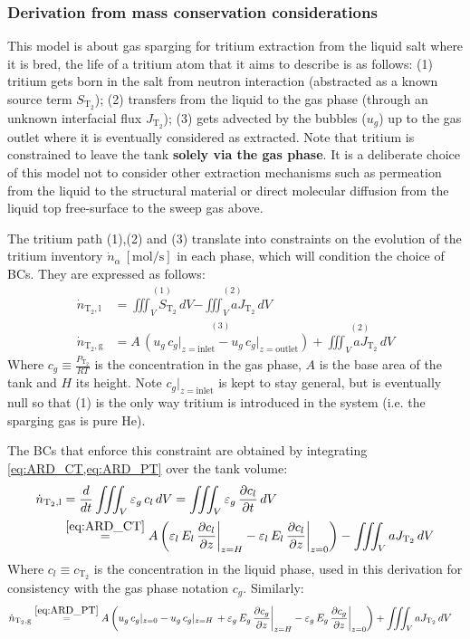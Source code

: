 \documentclass[a4paper,11pt,oneside]{report}
\newcommand{\PT}{\ensuremath{P_\mathrm{T_2}}}
\newcommand{\CT}{\ensuremath{c_\mathrm{T_2}}}
\newcommand{\JT}{\ensuremath{J_\mathrm{T_2}}}
\newcommand{\dotNTl}{\ensuremath{\dot n_\mathrm{T_2,l}}}
\newcommand{\dotNTg}{\ensuremath{\dot n_\mathrm{T_2,g}}}
\begin{document}
\subsubsection{Derivation from mass conservation considerations}

This model is about gas sparging for tritium extraction from the liquid salt where it is bred, the life of a tritium atom that it aims to describe is as follows: (1) tritium gets born in the salt from neutron interaction (abstracted as a known source term $S_\mathrm{T_2}$); (2) transfers from the liquid to the gas phase (through an unknown interfacial flux \JT); (3) gets advected by the bubbles ($u_g$) up to the gas outlet where it is eventually considered as extracted. Note that tritium is constrained to leave the tank \textbf{solely via the gas phase}. It is a deliberate choice of this model not to consider other extraction mechanisms such as permeation from the liquid to the structural material or direct molecular diffusion from the liquid top free-surface to the sweep gas above. 

The tritium path (1),(2) and (3) translate into constraints on the evolution of the tritium inventory $\dot n_\alpha \ \mathrm{[mol/s]}$ in each phase, which will condition the choice of BCs. They are expressed as follows: 
\begin{align}
    \dotNTl &= \stackrel{(1)}{\iiint_V S_\mathrm{T_2} \,dV}\stackrel{(2)}{- \iiint_V a\JT \,dV} \label{eq:n_l_constraint}\\
    \dotNTg &= \stackrel{(3)}{A \,(u_g\,c_g\rvert_{z=\mathrm{inlet}} - u_g\,c_g\rvert_{z=\mathrm{outlet}})} + \stackrel{(2)}{\iiint_V a\JT \,dV} \label{eq:n_g_constraint}
\end{align}
Where $c_g \equiv\frac{\PT}{RT}$ is the concentration in the gas phase, $A$ is the base area of the tank and $H$ its height. Note $c_g\rvert_{z=\mathrm{inlet}}$ is kept to stay general, but is eventually null so that (1) is the only way tritium is introduced in the system (i.e. the sparging gas is pure He).


The BCs that enforce this constraint are obtained by integrating \cref{eq:ARD_CT,eq:ARD_PT} over the tank volume:
\begin{align}
    \dotNTl &= \frac{d}{dt}\iiint_V \varepsilon_g \,c_l \,dV =\iiint_V \varepsilon_g \, \frac{\partial c_l}{\partial t}\,dV  \nonumber\\
    &\stackrel{\eqref{eq:ARD_CT}}{=} A\,\bigg(\varepsilon_l\,E_l\,\frac{\partial c_l}{\partial z}\bigg\rvert_{z=H} -\varepsilon_l\,E_l\,\frac{\partial c_l}{\partial z}\bigg\rvert_{z=0} \bigg)- \iiint_V a\JT \,dV  \label{eq:n_l_integrated}
\end{align}
Where $c_l\equiv \CT$ is the  concentration in the liquid phase, used in this derivation for consistency with the gas phase notation $c_g$. Similarly:
\begin{align}
    \dotNTg &\stackrel{\eqref{eq:ARD_PT}}{=}  A \,\bigg(u_g\,c_g\rvert_{z=0} - u_g\,c_g\rvert_{z=H} \,+ \varepsilon_g\,E_g\,\frac{\partial c_g}{\partial z}\bigg\rvert_{z=H} -\varepsilon_g\,E_g\,\frac{\partial c_g}{\partial z}\bigg\rvert_{z=0} \bigg) + \iiint_V a\JT \,dV \label{eq:n_g_integrated}
\end{align}
\end{document}
